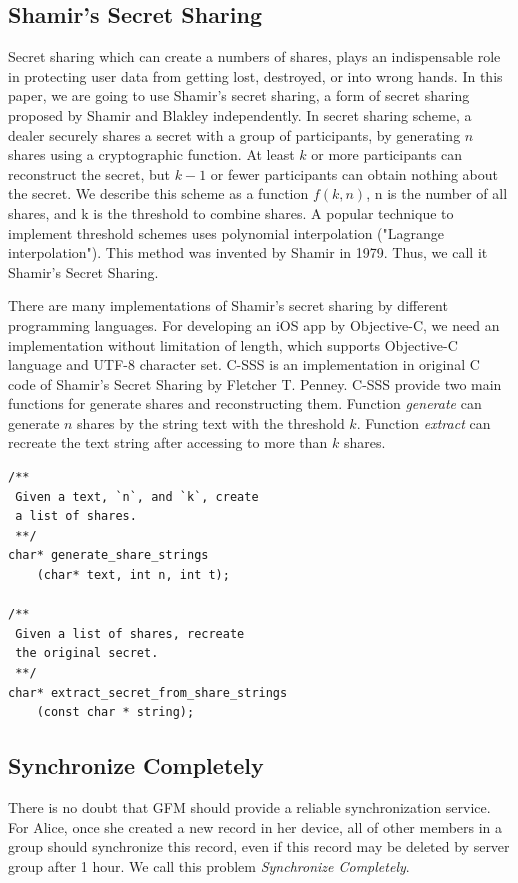 \documentclass[twocolumn,10pt]{article}
\begin{document}
\subsection{Shamir's Secret Sharing}
Secret sharing which can create a numbers of shares, plays an indispensable role in protecting user data from getting lost, destroyed, or into wrong hands. In this paper, we are going to use Shamir's secret sharing, a form of secret sharing proposed by Shamir and Blakley independently. In secret sharing scheme, a dealer securely shares a secret with a group of participants, by generating $n$ shares using a cryptographic function\cite{smith2013layered}. At least $k$ or more participants can reconstruct the secret, but $k-1$ or fewer participants can obtain nothing about the secret\cite{pang2005new}. We describe this scheme as a function $f(k, n)$, n is the number of all shares, and k is the threshold to combine shares. A popular technique to implement threshold schemes uses polynomial interpolation ("Lagrange interpolation"). This method was invented by Shamir in 1979. Thus, we call it Shamir's Secret Sharing.

There are many implementations of Shamir's secret sharing by different programming languages. For developing an iOS app by Objective-C, we need an implementation without limitation of length, which supports Objective-C language and UTF-8 character set. C-SSS\cite{c-sss} is an implementation in original C code of Shamir's Secret Sharing by Fletcher T. Penney. C-SSS provide two main functions for generate shares and reconstructing them. Function \emph{generate} can generate $n$ shares by the string text with the threshold $k$. Function \emph{extract} can recreate the text string after accessing to more than $k$ shares.

\begin{lstlisting}[language={[ANSI]C}, numberstyle=\tiny,keywordstyle=\color{blue!70},commentstyle=\color{red!50!green!50!blue!50},frame=shadowbox, rulesepcolor=\color{red!20!green!20!blue!20}]
/**
 Given a text, `n`, and `k`, create 
 a list of shares.
 **/
char* generate_share_strings
	(char* text, int n, int t);

/**
 Given a list of shares, recreate 
 the original secret.
 **/
char* extract_secret_from_share_strings
	(const char * string);
\end{lstlisting}

\subsection{Synchronize Completely}
There is no doubt that GFM should provide a reliable synchronization service. For Alice, once she created a new record in her device, all of other members in a group should synchronize this record, even if this record may be deleted by server group after 1 hour. We call this problem \emph{Synchronize Completely}.
\end{document}
